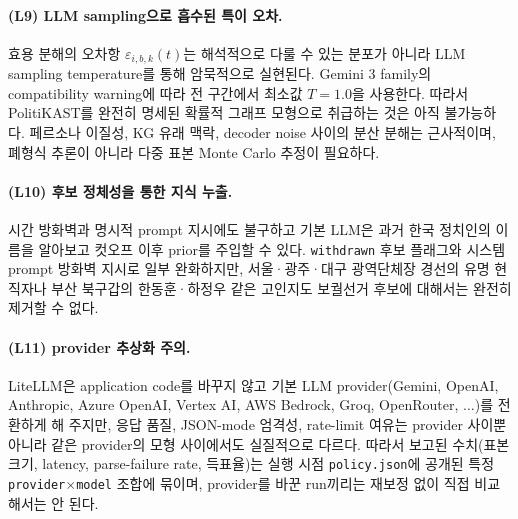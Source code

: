 \documentclass[11pt]{article}
\begin{document}
\paragraph{(L9) LLM sampling으로 흡수된 특이 오차.}
효용 분해의 오차항 $\varepsilon_{i,b,k}(t)$는 해석적으로 다룰 수 있는 분포가 아니라 LLM sampling temperature를 통해 암묵적으로 실현된다. Gemini 3 family의 compatibility warning에 따라 전 구간에서 최소값 $T=1.0$을 사용한다. 따라서 PolitiKAST를 완전히 명세된 확률적 그래프 모형으로 취급하는 것은 아직 불가능하다. 페르소나 이질성, KG 유래 맥락, decoder noise 사이의 분산 분해는 근사적이며, 폐형식 추론이 아니라 다중 표본 Monte Carlo 추정이 필요하다.

\paragraph{(L10) 후보 정체성을 통한 지식 누출.}
시간 방화벽과 명시적 prompt 지시에도 불구하고 기본 LLM은 과거 한국 정치인의 이름을 알아보고 컷오프 이후 prior를 주입할 수 있다. \texttt{withdrawn} 후보 플래그와 시스템 prompt 방화벽 지시로 일부 완화하지만, 서울·광주·대구 광역단체장 경선의 유명 현직자나 부산 북구갑의 한동훈·하정우 같은 고인지도 보궐선거 후보에 대해서는 완전히 제거할 수 없다.

\paragraph{(L11) provider 추상화 주의.}
LiteLLM은 application code를 바꾸지 않고 기본 LLM provider(Gemini, OpenAI, Anthropic, Azure OpenAI, Vertex AI, AWS Bedrock, Groq, OpenRouter, $\dots$)를 전환하게 해 주지만, 응답 품질, JSON-mode 엄격성, rate-limit 여유는 provider 사이뿐 아니라 같은 provider의 모형 사이에서도 실질적으로 다르다. 따라서 보고된 수치(표본 크기, latency, parse-failure rate, 득표율)는 실행 시점 \texttt{policy.json}에 공개된 특정 \texttt{provider}$\times$\texttt{model} 조합에 묶이며, provider를 바꾼 run끼리는 재보정 없이 직접 비교해서는 안 된다.
\end{document}
